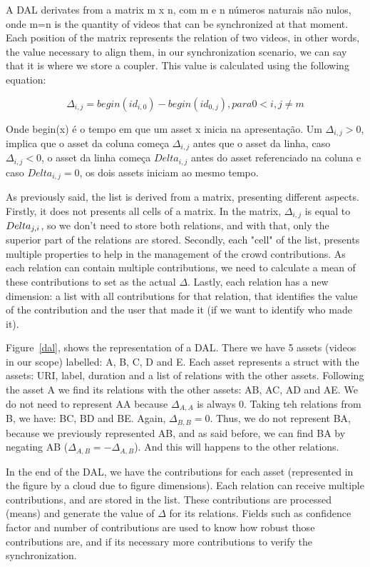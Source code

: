 \documentclass{sig-alternate-05-2015}
\begin{document}
A DAL derivates from a matrix m x n, com m e n números naturais não nulos, onde m=n is the quantity of videos that can be synchronized at that moment. Each position of the matrix represents the relation of two videos, in other words, the value necessary to align them, in our synchronization scenario, we can say that it is where we store a coupler. This value is calculated using the following equation:

\begin{equation}
	\Delta_{i,j}=begin(id_{i,0})-begin(id_{0,j}), para 0<i,j\neq m
	\label{matrix-fundament}
\end{equation}

Onde begin(x) é o tempo em que um asset x inicia na apresentação. Um $\Delta_{i,j} > 0$, implica que o asset da coluna começa $\Delta_{i,j}$ antes que o asset da linha, caso $\Delta_{i,j} < 0$, o asset da linha começa $Delta_{i,j}$ antes do asset referenciado na coluna e caso $Delta_{i,j} = 0$, os dois assets iniciam ao mesmo tempo.

As previously said, the list is derived from a matrix, presenting different aspects. Firstly, it does not presents all cells of a matrix. In the matrix, $\Delta_{i,j}$ is equal to $\-Delta_{j,i}$, so we don't need to store both relations, and with that, only the superior part of the relations are stored. Secondly, each "cell" of the list, presents multiple properties to help in the management of the crowd contributions. As each relation can contain multiple contributions, we need to calculate a mean of these contributions  to set as the actual $\Delta$. Lastly, each relation has a new dimension: a list with all contributions for that relation, that identifies the value of the contribution and the user that made it (if we want to identify who made it).

Figure~\ref{dal}, shows the representation of a DAL. There we have 5 assets (videos in our scope) labelled: A, B, C, D and E. Each asset represents a struct with the assets: URI, label, duration and a list of relations with the other assets. Following the asset A we find its relations with the other assets: AB, AC, AD and AE. We do not need to represent AA because $\Delta_{A,A}$ is always 0. Taking teh relations from B, we have: BC, BD and BE.  Again, $\Delta_{B,B} = 0$. Thus, we do not represent BA, because we previously represented AB, and as said before, we can find BA by negating AB ($\Delta_{A,B} = -\Delta_{A,B}$). And this will happens to the other relations.

In the end of the DAL, we have the contributions for each asset (represented in the figure by a cloud due to figure dimensions). Each relation can receive multiple contributions, and are stored in the list. These contributions are processed (means) and generate the value of $\Delta$ for its relations. Fields such as confidence factor and number of contributions are used to know how robust those contributions are, and if its necessary more contributions to verify the synchronization.
\end{document}
